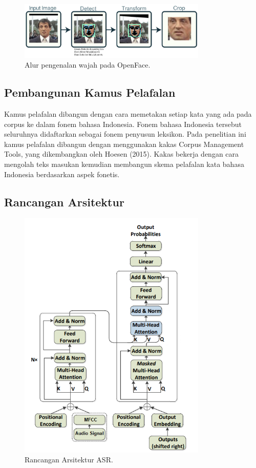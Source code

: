 \begin{figure}[h]
    \centering
    \includegraphics[width=0.8\textwidth]{resources/images/arsitektur-openface.png}
    \caption{Alur pengenalan wajah pada OpenFace.}
    \label{fig:arsitektur-openface}
\end{figure}


\subsection{Pembangunan Kamus Pelafalan}

Kamus pelafalan dibangun dengan cara memetakan setiap kata yang ada pada corpus ke dalam fonem bahasa Indonesia. Fonem bahasa Indonesia tersebut seluruhnya didaftarkan sebagai fonem penyusun leksikon. Pada penelitian ini kamus pelafalan dibangun dengan menggunakan kakas Corpus Management Tools, yang dikembangkan oleh Hoesen (2015). Kakas bekerja dengan cara mengolah teks masukan kemudian membangun skema pelafalan kata bahasa Indonesia berdasarkan aspek fonetis.


\subsection{Rancangan Arsitektur}

\begin{figure}[h]
    \centering
    \includegraphics[width=0.8\textwidth]{resources/images/usulan-arsitektur-asr.png}
    \caption{Rancangan Arsitektur ASR.}
    \label{fig:usulan-arsitektur-asr}
\end{figure}

